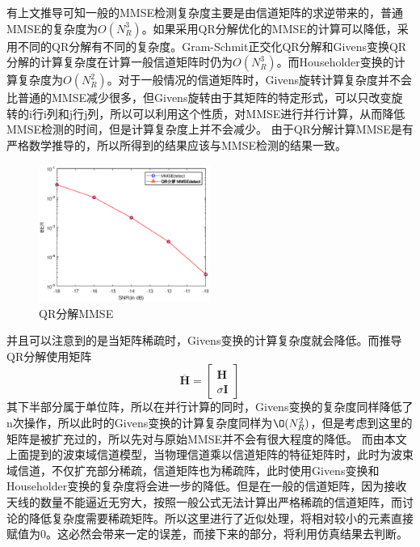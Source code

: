\documentclass[bachelor,nocolorlinks, printoneside]{seuthesis} %
\begin{document}
\begin{Main}
有上文推导可知一般的MMSE检测复杂度主要是由信道矩阵的求逆带来的，普通MMSE的复杂度为$O(N_R^3)$。如果采用QR分解优化的MMSE的计算可以降低，采用不同的QR分解有不同的复杂度。Gram-Schmit正交化QR分解和Givens变换QR分解的计算复杂度在计算一般信道矩阵时仍为$O(N_R^3)$。而Householder变换的计算复杂度为$O(N_R^2)$。对于一般情况的信道矩阵时，Givens旋转计算复杂度并不会比普通的MMSE减少很多，但Givens旋转由于其矩阵的特定形式，可以只改变旋转的i行i列和j行j列，所以可以利用这个性质，对MMSE进行并行计算，从而降低MMSE检测的时间，但是计算复杂度上并不会减少。
由于QR分解计算MMSE是有严格数学推导的，所以所得到的结果应该与MMSE检测的结果一致。

\begin{figure}[htbp!]
	\centering \includegraphics[width=0.5\textwidth]{img/3_9.eps} \caption{QR分解MMSE}
\end{figure}
	
并且可以注意到的是当矩阵稀疏时，Givens变换的计算复杂度就会降低。而推导QR分解使用矩阵
\begin{equation}\label{key}
\overline{\mathbf{H}} = \left[
\begin{array}{c}
\mathbf{H}\\
\sigma \mathbf{I}
\end{array} \right]
\end{equation}
其下半部分属于单位阵，所以在并行计算的同时，Givens变换的复杂度同样降低了n次操作，所以此时的Givens变换的计算复杂度同样为$\O(N_R^2)$，但是考虑到这里的矩阵是被扩充过的，所以先对与原始MMSE并不会有很大程度的降低。
而由本文上面提到的波束域信道模型，当物理信道乘以信道矩阵的特征矩阵时，此时为波束域信道，不仅扩充部分稀疏，信道矩阵也为稀疏阵，此时使用Givens变换和Householder变换的复杂度将会进一步的降低。但是在一般的信道矩阵，因为接收天线的数量不能逼近无穷大，按照一般公式无法计算出严格稀疏的信道矩阵，而讨论的降低复杂度需要稀疏矩阵。所以这里进行了近似处理，将相对较小的元素直接赋值为0。这必然会带来一定的误差，而接下来的部分，将利用仿真结果去判断。


\end{Main}
\end{document}
